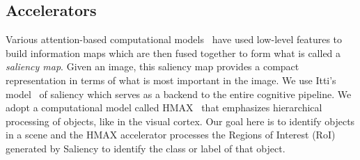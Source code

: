 
\subsection{Accelerators}
Various attention-based computational models~\cite{Itti2001,Bruce2009a} have used low-level features to build information maps which are then fused together to form what is called a \emph{saliency map}. Given an image, this saliency map provides a compact representation in terms of what is most important in the image. 
We use Itti's model~\cite{Peters2007} of saliency which serves as a backend to the entire cognitive pipeline. 
We adopt a computational model called HMAX~\cite{Mutch2008} that emphasizes hierarchical processing of objects, like in the visual cortex. Our goal here is to identify objects in a scene and the HMAX accelerator processes the Regions of Interest (RoI) generated by Saliency to identify the class or label of that object. 
